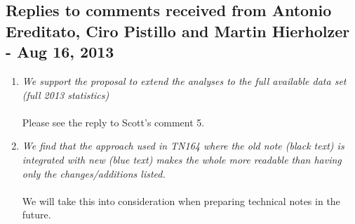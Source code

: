 \subsection{
  Replies to comments received from Antonio Ereditato, Ciro Pistillo and Martin Hierholzer - Aug 16, 2013 }

\begin{enumerate}

  \vspace{5 mm}
\item
  {\em
    We support the proposal to extend the analyses to the full available data set (full 2013 statistics)
  }\\
  \\
  Please see the reply to Scott's comment 5.

  \vspace{5 mm}
\item
  {\em
    We find that the approach used in TN164 where the old note (black text) is integrated with new (blue text)
    makes the whole more readable than having only the changes/additions listed.
  }\\
  \\
  We will take this into consideration when preparing technical notes in the future.


\end{enumerate}

